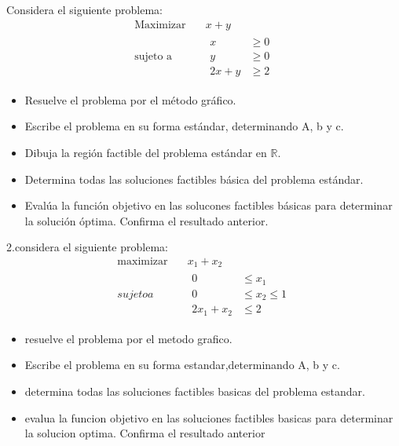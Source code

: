 \documentclass{article}
\begin{document}
Considera el siguiente problema:
\begin{equation*}
  \begin{aligned}
    \text{Maximizar}\quad & x+y \\
    \text{sujeto a}\quad &
    \begin{aligned}
      x & \geq 0\\
      y & \geq 0\\
      2x + y & \geq 2
    \end{aligned}
  \end{aligned}
\end{equation*}
\begin{itemize}
  \item Resuelve el problema por el método gráfico.\\
  \item Escribe el problema en su forma estándar, determinando A, b y c.\\
  \item Dibuja la región factible del problema estándar en $\mathbb{R}$.\\
  \item Determina todas las soluciones factibles básica del problema estándar.\\
  \item Evalúa la función objetivo en las solucones factibles básicas para determinar la solución óptima. Confirma el resultado anterior.

\end{itemize}
2.considera el siguiente problema:
\begin{equation}
\begin{aligned}
  \text{maximizar}\quad & x_1+x_2\\
  sujeto a \quad &
  \begin{aligned}
    0&\leq x_1\\
    0&\leq x_2\leq1\\
    2x_1+x_2& \leq2
    \end{aligned}
\end{aligned}
\end{equation}

\begin{itemize}

  \item resuelve el problema por el metodo grafico.
  \item Escribe el problema en su forma estandar,determinando A, b y c.
  \item determina todas las soluciones factibles basicas del problema estandar.
  \item evalua la funcion objetivo en las soluciones factibles basicas para determinar la solucion optima. Confirma el resultado anterior
 \end{itemize}
\end{document}
